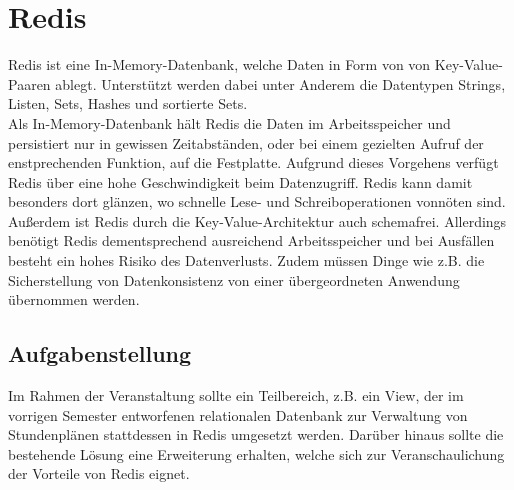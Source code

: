 
\section{Redis}
Redis ist eine In-Memory-Datenbank, welche Daten in Form von von Key-Value-Paaren ablegt. Unterstützt werden dabei unter Anderem die Datentypen Strings, Listen, Sets, Hashes und sortierte Sets.\\ 
Als In-Memory-Datenbank hält Redis die Daten im Arbeitsspeicher und persistiert nur in gewissen Zeitabständen, oder bei einem gezielten Aufruf der enstprechenden Funktion, auf die Festplatte. Aufgrund dieses Vorgehens verfügt Redis über eine hohe Geschwindigkeit beim Datenzugriff. Redis kann damit besonders dort glänzen, wo schnelle Lese- und Schreiboperationen vonnöten sind. Außerdem ist Redis durch die Key-Value-Architektur auch schemafrei. Allerdings benötigt Redis dementsprechend ausreichend Arbeitsspeicher und bei Ausfällen besteht ein hohes Risiko des Datenverlusts. Zudem müssen Dinge wie z.B. die Sicherstellung von Datenkonsistenz von einer übergeordneten Anwendung übernommen werden.

\vspace{18pt}

\subsection{Aufgabenstellung}
Im Rahmen der Veranstaltung sollte ein Teilbereich, z.B. ein View, der im vorrigen Semester entworfenen relationalen Datenbank zur Verwaltung von Stundenplänen stattdessen in Redis umgesetzt werden. Darüber hinaus sollte die bestehende Lösung eine Erweiterung erhalten, welche sich zur Veranschaulichung der Vorteile von Redis eignet.

\newpage

